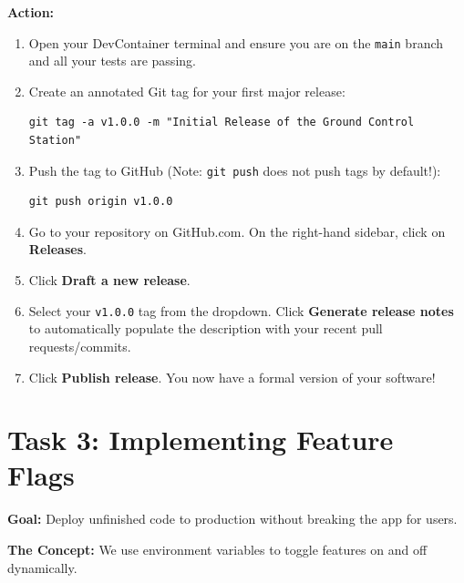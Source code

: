\documentclass[a4paper,12pt]{article}
\begin{document}
\vspace{0.3cm}
\textbf{Action:}
\begin{enumerate}
    \item Open your DevContainer terminal and ensure you are on the \texttt{main} branch and all your tests are passing.
    \item Create an annotated Git tag for your first major release:
    \begin{verbatim}
git tag -a v1.0.0 -m "Initial Release of the Ground Control Station"
    \end{verbatim}
    \item Push the tag to GitHub (Note: \texttt{git push} does not push tags by default!):
    \begin{verbatim}
git push origin v1.0.0
    \end{verbatim}
    \item Go to your repository on GitHub.com. On the right-hand sidebar, click on \textbf{Releases}.
    \item Click \textbf{Draft a new release}.
    \item Select your \texttt{v1.0.0} tag from the dropdown. Click \textbf{Generate release notes} to automatically populate the description with your recent pull requests/commits.
    \item Click \textbf{Publish release}. You now have a formal version of your software!
\end{enumerate}


\section*{Task 3: Implementing Feature Flags}

\textbf{Goal:} Deploy unfinished code to production without breaking the app for users.

\textbf{The Concept:} We use environment variables to toggle features on and off dynamically. 
\end{document}
